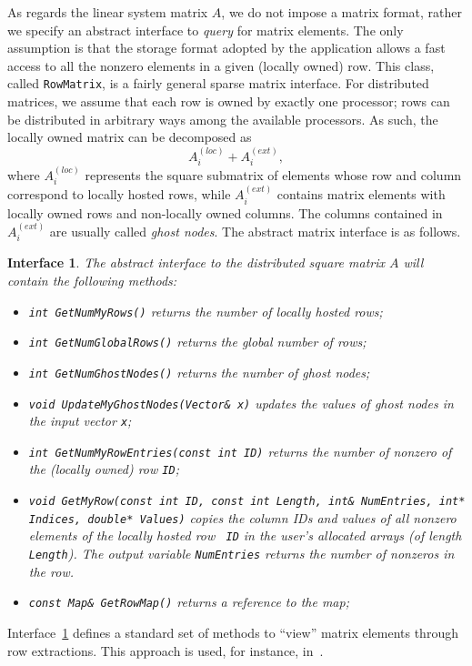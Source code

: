 \documentclass[acmtocl]{acmtrans2m}
\newtheorem{interface}{Interface}[section]
\begin{document}
As regards the linear system matrix $A$, we do not impose a matrix format,
rather we specify an abstract interface to {\sl query} for matrix elements. 
The only assumption is
that the storage format adopted by the application allows a fast access to all
the nonzero elements in a given (locally owned) row.
This class, called {\tt RowMatrix}, is a fairly general sparse matrix 
interface. For
distributed matrices, we assume that each row is owned by exactly
one processor; rows can be distributed in arbitrary ways among the available
processors. As such, the locally owned matrix can be decomposed as
\begin{equation}
A^{(loc)}_i + A^{(ext)}_i,
\end{equation}
where $A^{(loc)}_i$ represents the square submatrix of elements whose row
and column correspond to locally hosted rows, while
$A^{(ext)}_i$ contains matrix elements with locally owned rows and
non-locally owned columns. The
columns contained in $A_i^{(ext)}$ are usually called {\sl ghost nodes}.
The abstract matrix interface is as
follows.
\begin{interface}
\label{int:ami}
The abstract interface to the distributed square matrix $A$
will contain the following methods:
\begin{itemize}
\item \verb!int GetNumMyRows()! returns the number of locally hosted rows;
\item \verb!int GetNumGlobalRows()! returns the global number of rows;
\item \verb!int GetNumGhostNodes()! returns the number of ghost nodes;
\item \verb!void UpdateMyGhostNodes(Vector& x)! updates the values of ghost nodes
 in the input vector {\tt x};
\item {\tt int GetNumMyRowEntries(const int ID)} returns the number of nonzero of
the (locally owned) row {\tt ID};
\item {\tt void GetMyRow(const int ID, const int Length, int\& NumEntries, int* Indices, double*
                             Values)} copies the
column IDs and values of all nonzero elements of the locally hosted row {\tt
  ID} in the user's allocated arrays (of length {\tt Length}). The output
  variable {\tt NumEntries} returns the number of nonzeros in the row.
\item \verb!const Map& GetRowMap()! returns a reference to the map;
\end{itemize}
\end{interface}
Interface~\ref{int:ami} defines a standard set of methods to ``view'' matrix
elements through row extractions. This approach is used, 
for instance, in~\cite{Epetra-Ref-Guide,ml-guide,duff02overview,lujan00oolala}.
\end{document}
